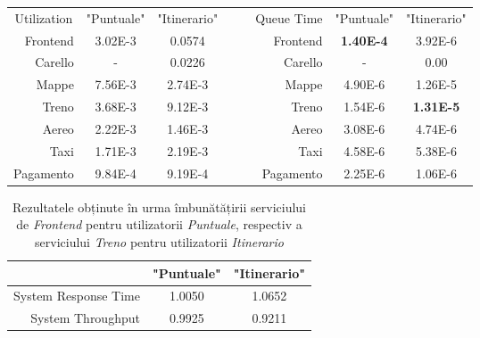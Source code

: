 \documentclass[12pt]{article}
\begin{document}
            \begin{table}[!h]
                \centering
                \begin{tabular}{r|cclrr|cc}
                    \multicolumn{1}{c|}{Utilization} & "Puntuale" & "Itinerario" &  & \multicolumn{1}{c}{} & \multicolumn{1}{c|}{Queue Time} & "Puntuale"       & "Itinerario"     \\ \cline{1-3} \cline{6-8} 
                    Frontend                         & 3.02E-3    & 0.0574       &  &                      & Frontend                        & \textbf{1.40E-4} & 3.92E-6          \\
                    Carello                          & -          & 0.0226       &  &                      & Carello                         & -                & 0.00             \\
                    Mappe                            & 7.56E-3    & 2.74E-3      &  &                      & Mappe                           & 4.90E-6          & 1.26E-5          \\
                    Treno                            & 3.68E-3    & 9.12E-3      &  &                      & Treno                           & 1.54E-6          & \textbf{1.31E-5} \\
                    Aereo                            & 2.22E-3    & 1.46E-3      &  &                      & Aereo                           & 3.08E-6          & 4.74E-6          \\
                    Taxi                             & 1.71E-3    & 2.19E-3      &  &                      & Taxi                            & 4.58E-6          & 5.38E-6          \\
                    Pagamento                        & 9.84E-4    & 9.19E-4      &  &                      & Pagamento                       & 2.25E-6          & 1.06E-6         
                    \end{tabular}
            \end{table}

            \begin{table}[!h]
                \centering
                \begin{tabular}{r|cc}
                    \multicolumn{1}{c|}{} & "Puntuale" & "Itinerario" \\ \hline
                    System Response Time  & 1.0050     & 1.0652       \\
                    System Throughput     & 0.9925     & 0.9211      
                \end{tabular}
                \caption{Rezultatele obținute în urma îmbunătățirii serviciului de \textit{Frontend} pentru utilizatorii \textit{Puntuale}, respectiv a serviciului \textit{Treno} pentru utilizatorii \textit{Itinerario}}
            \end{table}
\end{document}
